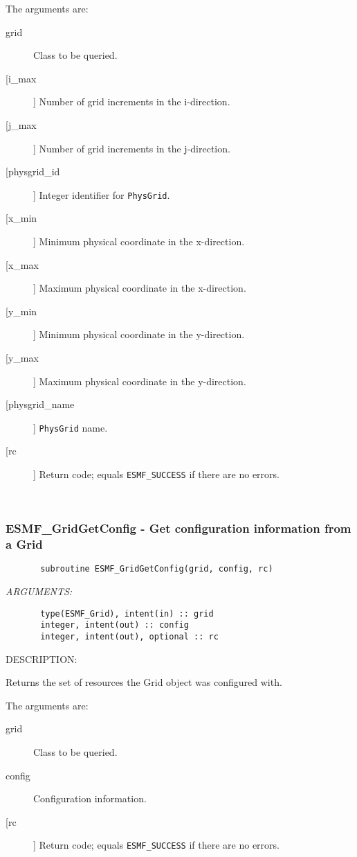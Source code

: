        The arguments are:
       \begin{description}
       \item[grid]
            Class to be queried.
       \item[[i\_max]]
            Number of grid increments in the i-direction.
       \item[[j\_max]]
            Number of grid increments in the j-direction.
       \item [[physgrid\_id]]
            Integer identifier for {\tt PhysGrid}.
       \item[[x\_min]]
            Minimum physical coordinate in the x-direction.
       \item[[x\_max]]
            Maximum physical coordinate in the x-direction.
       \item[[y\_min]]
            Minimum physical coordinate in the y-direction.
       \item[[y\_max]]
            Maximum physical coordinate in the y-direction.
       \item [[physgrid\_name]]
            {\tt PhysGrid} name.
       \item[[rc]]
            Return code; equals {\tt ESMF\_SUCCESS} if there are no errors.
       \end{description}
   
 
\mbox{}\hrulefill\ 
 
\subsubsection{ESMF\_GridGetConfig - Get configuration information from a Grid}


 
\begin{verbatim}       subroutine ESMF_GridGetConfig(grid, config, rc)\end{verbatim}{\em ARGUMENTS:}
\begin{verbatim}       type(ESMF_Grid), intent(in) :: grid
       integer, intent(out) :: config
       integer, intent(out), optional :: rc\end{verbatim}
{\sf DESCRIPTION:\\ }


       Returns the set of resources the Grid object was configured with.
  
       The arguments are:
       \begin{description}
       \item[grid]
            Class to be queried.
       \item[config]
            Configuration information.
       \item[[rc]]
            Return code; equals {\tt ESMF\_SUCCESS} if there are no errors.
       \end{description}
   
